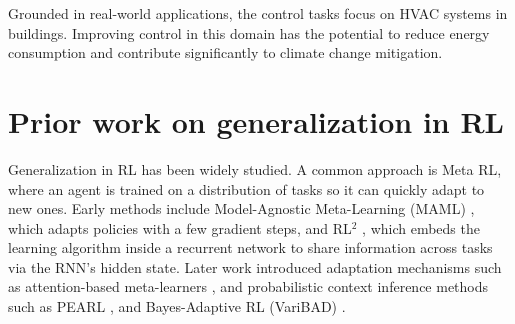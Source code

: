 \documentclass[10pt]{article} %
\begin{document}
\begin{itemize}
Grounded in real-world applications, the control tasks focus on HVAC systems in buildings. Improving control in this domain has the potential to reduce energy consumption and contribute significantly to climate change mitigation.


\appendix








\beginSupplementaryMaterials

\section{Prior work on generalization in RL}
\label{apdx:prior_work_generalization_rl}

Generalization in RL has been widely studied. A common approach is Meta RL, where an agent is trained on a distribution of tasks so it can quickly adapt to new ones. Early methods include Model-Agnostic Meta-Learning (MAML) \citep{btap2022}, which adapts policies with a few gradient steps, and RL$^2$ \citep{duan2016}, which embeds the learning algorithm inside a recurrent network to share information across tasks via the RNN's hidden state. Later work introduced adaptation mechanisms such as attention-based meta-learners \citep{mishra2018}, and probabilistic context inference methods such as PEARL \citep{rakelly2019}, and Bayes-Adaptive RL (VariBAD) \citep{zintgraf2020}. 


\end{itemize}
\end{document}
